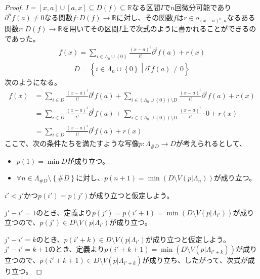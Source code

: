 \documentclass[dvipdfmx]{jsarticle}
\begin{document}
\begin{proof}
$I = [ x,a] \cup [ a,x] \subseteq D(f) \subseteq \mathbb{R}$なる区間$I$で$n$回微分可能であり$\partial^{n}f(a) \neq 0$なる関数$f:D(f) \rightarrow \mathbb{R}$に対し、その関数$f$は$r \in o_{(x - a)^{n},a}$なるある関数$r:D(f) \rightarrow \mathbb{R}$を用いてその区間$I$上で次式のように書かれることができるのであった。
\begin{align*}
f(x) = \sum_{i \in \varLambda_{n} \cup \left\{ 0 \right\}} {\frac{(x - a)^{i}}{i!}\partial^{i}f(a)} + r(x)
\end{align*}
\begin{align*}
D = \left\{ i \in \varLambda_{n} \cup \left\{ 0 \right\} \middle| \partial^{i}f(a) \neq 0 \right\}
\end{align*}
次のようになる。
\begin{align*}
f(x) &= \sum_{i \in D} {\frac{(x - a)^{i}}{i!}\partial^{i}f(a)} + \sum_{i \in \left( \varLambda_{n} \cup \left\{ 0 \right\} \right) \setminus D} {\frac{(x - a)^{i}}{i!}\partial^{i}f(a)} + r(x)\\
&= \sum_{i \in D} {\frac{(x - a)^{i}}{i!}\partial^{i}f(a)} + \sum_{i \in \left( \varLambda_{n} \cup \left\{ 0 \right\} \right) \setminus D} {\frac{(x - a)^{i}}{i!} \cdot 0} + r(x)\\
&= \sum_{i \in D} {\frac{(x - a)^{i}}{i!}\partial^{i}f(a)} + r(x)
\end{align*}
ここで、次の条件たちを満たすような写像$p:\varLambda_{\#D} \rightarrow D$が考えられるとして、
\begin{itemize}
\item
  $p(1) = \min D$が成り立つ。
\item
  $\forall n \in \varLambda_{\#D} \setminus \left\{ \#D \right\}$に対し、$p(n + 1) = \min\left( D \setminus V\left( p|\varLambda_{n} \right) \right)$が成り立つ。
\end{itemize}
$i' < j'$かつ$p\left( i' \right) = p\left( j' \right)$が成り立つと仮定しよう。\par
$j' - i' = 1$のとき、定義より$p\left( j' \right) = p\left( i' + 1 \right) = \min\left( D \setminus V\left( p|\varLambda_{i'} \right) \right)$が成り立つので、$p\left( j' \right) \in D \setminus V\left( p|\varLambda_{i'} \right)$が成り立つ。\par
$j' - i' = k$のとき、$p\left( i' + k \right) \in D \setminus V\left( p|\varLambda_{i'} \right)$が成り立つと仮定しよう。$j' - i' = k + 1$のとき、定義より$p\left( i' + k + 1 \right) = \min\left( D \setminus V\left( p|\varLambda_{i' + k} \right) \right)$が成り立つので、$p\left( i' + k + 1 \right) \in D \setminus V\left( p|\varLambda_{i' + k} \right)$が成り立ち、したがって、次式が成り立つ。

\end{proof}
\end{document}
